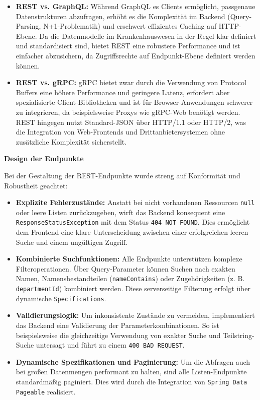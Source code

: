 \begin{itemize}
    \item \textbf{REST vs. GraphQL:} 
    Während GraphQL es Clients ermöglicht, passgenaue Datenstrukturen abzufragen, erhöht es die Komplexität im Backend (Query-Parsing, N+1-Problematik) und erschwert effizientes Caching auf HTTP-Ebene. 
    Da die Datenmodelle im Krankenhauswesen in der Regel klar definiert und standardisiert sind, bietet REST eine robustere Performance und ist einfacher abzusichern, da Zugriffsrechte auf Endpunkt-Ebene definiert werden können.
    
    \item \textbf{REST vs. gRPC:} 
    gRPC bietet zwar durch die Verwendung von Protocol Buffers eine höhere Performance und geringere Latenz, erfordert aber spezialisierte Client-Bibliotheken und ist für Browser-Anwendungen schwerer zu integrieren, da beispielsweise Proxys wie gRPC-Web benötigt werden.
    REST hingegen nutzt Standard-JSON über HTTP/1.1 oder HTTP/2, was die Integration von Web-Frontends und Drittanbietersystemen ohne zusätzliche Komplexität sicherstellt.
\end{itemize}

\textbf{Design der Endpunkte}

Bei der Gestaltung der REST-Endpunkte wurde streng auf Konformität und Robustheit geachtet:

\begin{itemize}
    \item \textbf{Explizite Fehlerzustände:} Anstatt bei nicht vorhandenen Ressourcen \texttt{null} oder leere Listen zurückzugeben, wirft das Backend konsequent eine \texttt{ResponseStatusException} mit dem Status \texttt{404 NOT FOUND}. 
    Dies ermöglicht dem Frontend eine klare Unterscheidung zwischen einer erfolgreichen leeren Suche und einem ungültigen Zugriff.
    \item \textbf{Kombinierte Suchfunktionen:} Alle Endpunkte unterstützen komplexe Filteroperationen. 
    Über Query-Parameter können Suchen nach exakten Namen, Namensbestandteilen (\texttt{nameContains}) oder Zugehörigkeiten (z. B. \texttt{departmentId}) kombiniert werden.
    Diese serverseitige Filterung erfolgt über dynamische \texttt{Specifications}. 
    \item \textbf{Validierungslogik:} Um inkonsistente Zustände zu vermeiden, implementiert das Backend eine Validierung der Parameterkombinationen. 
    So ist beispielsweise die gleichzeitige Verwendung von exakter Suche und Teilstring-Suche untersagt und führt zu einem \texttt{400 BAD REQUEST}.
    \item \textbf{Dynamische Spezifikationen und Paginierung:}
    Um die Abfragen auch bei großen Datenmengen performant zu halten, sind alle Listen-Endpunkte standardmäßig paginiert. 
    Dies wird durch die Integration von \texttt{Spring Data Pageable} realisiert. 
   

\end{itemize}
\newpage
